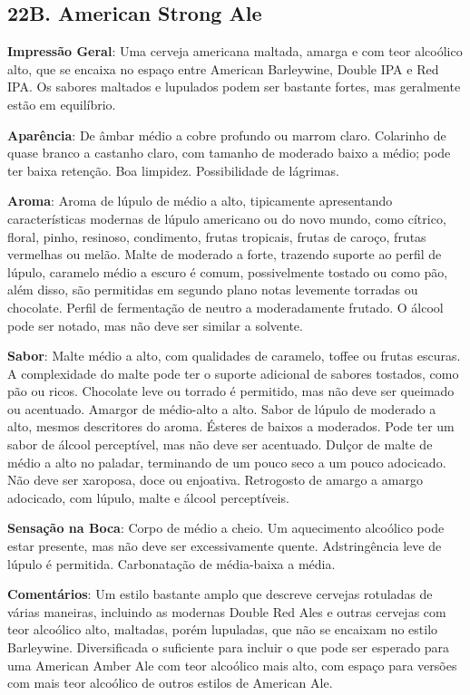 \subsection*{22B. American Strong Ale}
\textbf{Impressão Geral}: Uma cerveja americana maltada, amarga e com teor alcoólico alto, que se encaixa no espaço entre American Barleywine, Double IPA e Red IPA. Os sabores maltados e lupulados podem ser bastante fortes, mas geralmente estão em equilíbrio.

\textbf{Aparência}: De âmbar médio a cobre profundo ou marrom claro. Colarinho de quase branco a castanho claro, com tamanho de moderado baixo a médio; pode ter baixa retenção. Boa limpidez. Possibilidade de lágrimas.

\textbf{Aroma}: Aroma de lúpulo de médio a alto, tipicamente apresentando características modernas de lúpulo americano ou do novo mundo, como cítrico, floral, pinho, resinoso, condimento, frutas tropicais, frutas de caroço, frutas vermelhas ou melão. Malte de moderado a forte, trazendo suporte ao perfil de lúpulo, caramelo médio a escuro é comum, possivelmente tostado ou como pão, além disso, são permitidas em segundo plano notas levemente torradas ou chocolate. Perfil de fermentação de neutro a moderadamente frutado. O álcool pode ser notado, mas não deve ser similar a solvente.

\textbf{Sabor}: Malte médio a alto, com qualidades de caramelo, toffee ou frutas escuras. A complexidade do malte pode ter o suporte adicional de sabores tostados, como pão ou ricos. Chocolate leve ou torrado é permitido, mas não deve ser queimado ou acentuado. Amargor de médio-alto a alto. Sabor de lúpulo de moderado a alto, mesmos descritores do aroma. Ésteres de baixos a moderados. Pode ter um sabor de álcool perceptível, mas não deve ser acentuado. Dulçor de malte de médio a alto no paladar, terminando de um pouco seco a um pouco adocicado. Não deve ser xaroposa, doce ou enjoativa. Retrogosto de amargo a amargo adocicado, com lúpulo, malte e álcool perceptíveis.

\textbf{Sensação na Boca}: Corpo de médio a cheio. Um aquecimento alcoólico pode estar presente, mas não deve ser excessivamente quente. Adstringência leve de lúpulo é permitida. Carbonatação de média-baixa a média.

\textbf{Comentários}: Um estilo bastante amplo que descreve cervejas rotuladas de várias maneiras, incluindo as modernas Double Red Ales e outras cervejas com teor alcoólico alto, maltadas, porém lupuladas, que não se encaixam no estilo Barleywine. Diversificada o suficiente para incluir o que pode ser esperado para uma American Amber Ale com teor alcoólico mais alto, com espaço para versões com mais teor alcoólico de outros estilos de American Ale.

